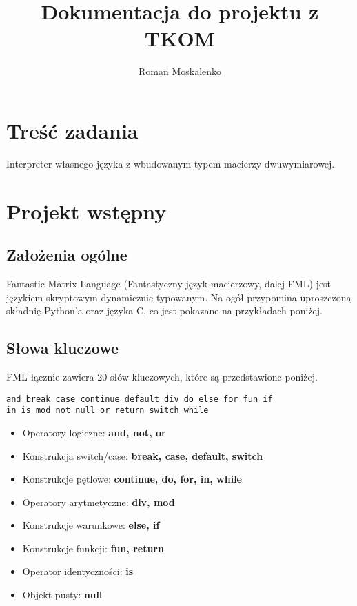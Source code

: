 \documentclass[12pt,a4paper]{article}
\title{Dokumentacja do projektu z TKOM}
\author{Roman Moskalenko}
\date{}
\begin{document}
\maketitle
\tableofcontents
\pagebreak

\section{Treść zadania}
Interpreter własnego języka z wbudowanym typem macierzy dwuwymiarowej.

\section{Projekt wstępny}
\subsection{Założenia ogólne}

Fantastic Matrix Language (Fantastyczny język macierzowy, dalej FML) jest językiem skryptowym dynamicznie typowanym. Na ogół przypomina uproszczoną składnię Python'a oraz języka C, co jest pokazane na przykładach poniżej.

%
%
\subsection{Słowa kluczowe}

FML łącznie zawiera 20 słów kluczowych, które są przedstawione poniżej.

\begin{lstlisting}
and break case continue default div do else for fun if 
in is mod not null or return switch while
\end{lstlisting}

\begin{itemize}
\item Operatory logiczne: \textbf{and, not, or}

\item Konstrukcja switch/case: \textbf{break, case, default, switch}

\item Konstrukcje pętlowe: \textbf{continue, do, for, in, while}

\item Operatory arytmetyczne: \textbf{div, mod}

\item Konstrukcje warunkowe: \textbf{else, if}

\item Konstrukcje funkcji: \textbf{fun, return}

\item Operator identyczności: \textbf{is}

\item Objekt pusty: \textbf{null}

\end{itemize}
\pagebreak
\end{document}
